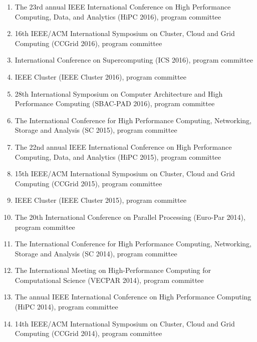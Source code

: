 \documentclass[margin,line]{cv}
\begin{document}
\begin{resume}
\begin{enumerate}
\item The 23rd annual IEEE International Conference on High Performance Computing, Data, and Analytics (HiPC 2016), program committee

\item 16th IEEE/ACM International Symposium on Cluster, Cloud and Grid Computing (CCGrid 2016), program committee

\item International Conference on Supercomputing (ICS 2016), program committee

\item IEEE Cluster (IEEE Cluster 2016), program committee

\item 28th International Symposium on Computer Architecture and High Performance Computing (SBAC-PAD 2016), program committee

\item The International Conference for High Performance Computing, Networking, Storage and Analysis (SC 2015), program committee

\item The 22nd annual IEEE International Conference on High Performance Computing, Data, and Analytics (HiPC 2015), program committee

\item 15th IEEE/ACM International Symposium on Cluster, Cloud and Grid Computing (CCGrid 2015), program committee

\item IEEE Cluster (IEEE Cluster 2015), program committee

\item The 20th International Conference on Parallel Processing (Euro-Par 2014), program committee

\item The International Conference for High Performance Computing, Networking, Storage and Analysis (SC 2014), program committee

\item The International Meeting on High-Performance Computing for Computational Science (VECPAR 2014), program committee

\item The annual IEEE International Conference on High Performance Computing (HiPC 2014), program committee

\item 14th IEEE/ACM International Symposium on Cluster, Cloud and Grid Computing (CCGrid 2014), program committee


\end{enumerate}
\end{resume}
\end{document}
